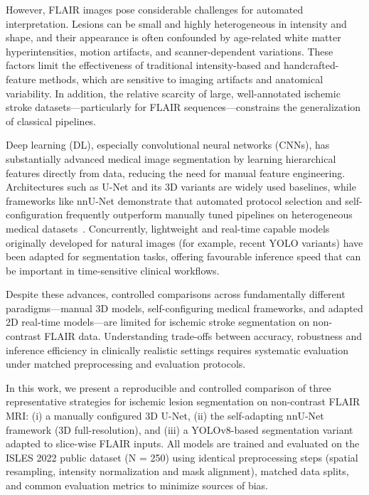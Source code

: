 \documentclass[12pt]{article}
\begin{document}
However, FLAIR images pose considerable challenges for automated interpretation. Lesions can be small and highly heterogeneous in intensity and shape, and their appearance is often confounded by age-related white matter hyperintensities, motion artifacts, and scanner-dependent variations. These factors limit the effectiveness of traditional intensity-based and handcrafted-feature methods, which are sensitive to imaging artifacts and anatomical variability. In addition, the relative scarcity of large, well-annotated ischemic stroke datasets—particularly for FLAIR sequences—constrains the generalization of classical pipelines.

Deep learning (DL), especially convolutional neural networks (CNNs), has substantially advanced medical image segmentation by learning hierarchical features directly from data, reducing the need for manual feature engineering. Architectures such as U-Net and its 3D variants are widely used baselines, while frameworks like nnU-Net demonstrate that automated protocol selection and self-configuration frequently outperform manually tuned pipelines on heterogeneous medical datasets~\cite{Isensee2021}. Concurrently, lightweight and real-time capable models originally developed for natural images (for example, recent YOLO variants) have been adapted for segmentation tasks, offering favourable inference speed that can be important in time-sensitive clinical workflows.

Despite these advances, controlled comparisons across fundamentally different para\-digms—manual 3D models, self-configuring medical frameworks, and adapted 2D real-time models—are limited for ischemic stroke segmentation on non-contrast FLAIR data. Understanding trade-offs between accuracy, robustness and inference efficiency in clinically realistic settings requires systematic evaluation under matched preprocessing and evaluation protocols.

In this work, we present a reproducible and controlled comparison of three representative strategies for ischemic lesion segmentation on non-contrast FLAIR MRI: (i) a manually configured 3D U-Net, (ii) the self-adapting nnU-Net framework (3D full-resolution), and (iii) a YOLOv8-based segmentation variant adapted to slice-wise FLAIR inputs. All models are trained and evaluated on the ISLES 2022 public dataset (N = 250) using identical preprocessing steps (spatial resampling, intensity normalization and mask alignment), matched data splits, and common evaluation metrics to minimize sources of bias.
\end{document}
